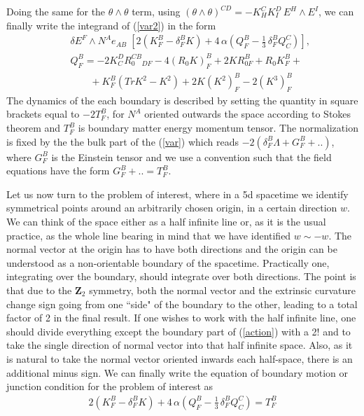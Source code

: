 \documentclass[a4paper,a4paper]{article}
\begin{document}
Doing the same for the $\theta \wedge \theta$ term, 
using  $(\theta \wedge \theta)^{CD}=- K^C_H K^D_I \, E^H \wedge E^I$, 
we can finally write the integrand of (\ref{var2}) in the form
\begin{eqnarray} \label{thing} 
&&  \delta E^F \wedge N^A e_{AB} \; [2 (K^B_F- \delta^B_F K) 
+4 \, \alpha ( Q^B_F- \frac{1}{3} \, \delta^B_F Q^C_C )], \\
&&Q^B_F= -2 K^D_C R^{CB}_{0\quad DF}-4 (R_0 K)^B_F +2 K R^B_{0F}+ R_0 K^B_F+ \nonumber \\ \nonumber && \qquad+
 K^B_F (TrK^2-K^2)+
2K (K^2)^B_F -2 (K^3)^B_F \nonumber
\end{eqnarray}
The dynamics of the each boundary is described by setting the quantity in square brackets equal to 
$-2 T^B_F$, for $N^A$ oriented outwards the space
 according to Stokes theorem and
 $T^B_F$ is boundary matter energy momentum tensor. The 
normalization is fixed by the 
the bulk part of the (\ref{var}) which reads $-2( \delta^B_F \Lambda + G^B_F+..)$, where
$G^B_F$ is the Einstein tensor and we use a convention such that the field equations have
the form $G^B_F+..=T^B_F$.


Let us now turn to the problem of interest, where in a 5d spacetime we identify symmetrical points
around an arbitrarily chosen origin, in a certain direction $w$.  
We can think of the space  either as a half infinite line or, as it
is the usual practice, as the
whole line bearing in mind that we have identified $w \sim -w$. The normal vector at the
origin has to have both directions and the origin can be understood as
a non-orientable boundary of the spacetime. Practically
 one, integrating over the boundary, should 
integrate over both directions. The point is that
due to the $\mathbf Z_2$ symmetry, both the normal vector and the extrinsic curvature change sign
going from one ``side" of the boundary to the other, leading to a total factor of 2 in the final 
result. If one wishes to work with the half infinite line, one should divide everything except the
boundary part of (\ref{action}) with a 2! and to take the single direction of normal vector into
that half infinite space.  
Also, as it is natural to take the normal vector oriented inwards each half-space,
there is an additional minus sign.
We can finally write the equation of boundary motion or junction condition for the problem of
interest as 
\begin{eqnarray} \label{fin3}
2 (K^B_F- \delta^B_F K) 
+4 \, \alpha ( Q^B_F- \frac{1}{3} \, \delta^B_F Q^C_C )=T^B_{F}
\end{eqnarray}
\end{document}
